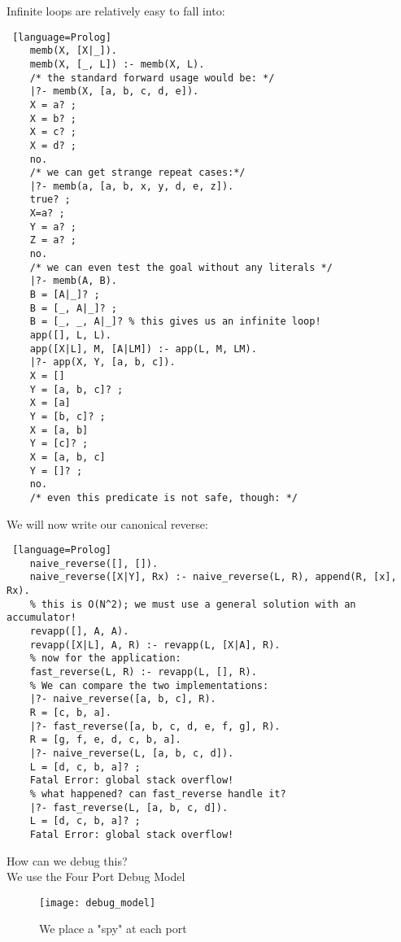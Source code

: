 \documentclass[../../lecture_notes.tex]{subfiles}
\begin{document}
\begin{center}  \end{center}

Infinite loops are relatively easy to fall into:
\begin{lstlisting} [language=Prolog]
	memb(X, [X|_]).
 	memb(X, [_, L]) :- memb(X, L).
 	/* the standard forward usage would be: */
 	|?- memb(X, [a, b, c, d, e]).
	X = a? ;
	X = b? ;
	X = c? ;
	X = d? ;
	no.
	/* we can get strange repeat cases:*/
	|?- memb(a, [a, b, x, y, d, e, z]).
	true? ;
	X=a? ;
	Y = a? ;
	Z = a? ;
	no.
	/* we can even test the goal without any literals */
	|?- memb(A, B).
	B = [A|_]? ;
	B = [_, A|_]? ;
	B = [_, _, A|_]? % this gives us an infinite loop!
	app([], L, L).
	app([X|L], M, [A|LM]) :- app(L, M, LM).
	|?- app(X, Y, [a, b, c]).
	X = []
	Y = [a, b, c]? ;
	X = [a]
	Y = [b, c]? ;
	X = [a, b]
	Y = [c]? ;
	X = [a, b, c]
	Y = []? ;
	no.
	/* even this predicate is not safe, though: */
\end{lstlisting}
\noindent We will now write our canonical reverse:
\begin{lstlisting} [language=Prolog]
 	naive_reverse([], []).
 	naive_reverse([X|Y], Rx) :- naive_reverse(L, R), append(R, [x], Rx).
 	% this is O(N^2); we must use a general solution with an accumulator!
 	revapp([], A, A).
 	revapp([X|L], A, R) :- revapp(L, [X|A], R).
 	% now for the application:
 	fast_reverse(L, R) :- revapp(L, [], R).
 	% We can compare the two implementations:
 	|?- naive_reverse([a, b, c], R).
 	R = [c, b, a].
 	|?- fast_reverse([a, b, c, d, e, f, g], R).
 	R = [g, f, e, d, c, b, a].
 	|?- naive_reverse(L, [a, b, c, d]).
 	L = [d, c, b, a]? ;
 	Fatal Error: global stack overflow!
 	% what happened? can fast_reverse handle it?
 	|?- fast_reverse(L, [a, b, c, d]).
 	L = [d, c, b, a]? ;
 	Fatal Error: global stack overflow!
\end{lstlisting}
\newpage
How can we debug this?\\
\indent We use the Four Port Debug Model
\begin{figure}[H]
	\centering
	\texttt{[image: debug\_model]}
	\caption{We place a "spy" at each port}
	\label{fig:test}
\end{figure}
\end{document}
